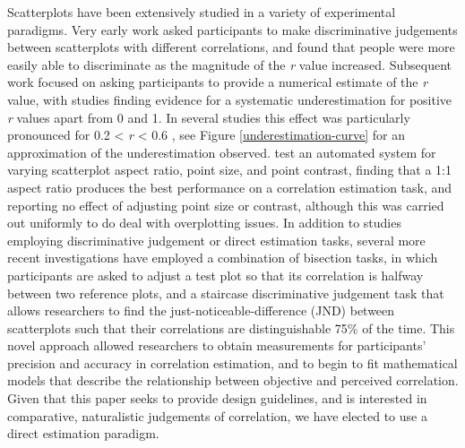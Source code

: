 \documentclass[preprint, 3p,
authoryear]{elsarticle} %
\begin{document}
Scatterplots have been extensively studied in a variety of experimental
paradigms. Very early work \citep{pollack_1960} asked participants to
make discriminative judgements between scatterplots with different
correlations, and found that people were more easily able to
discriminate as the magnitude of the \emph{r} value increased.
Subsequent work focused on asking participants to provide a numerical
estimate of the \emph{r} value, with studies finding evidence for a
systematic underestimation for positive \emph{r} values apart from 0 and
1. In several studies this effect was particularly pronounced for 0.2
\textless{} \emph{r} \textless{} 0.6
\citep{strahan_1978, bobko_1979, cleveland_1982, lane_1985, lauer_1989, collyer_1990, meyer_1992},
see Figure \ref{underestimation-curve} for an approximation of the
underestimation observed. \citealp{micallef_2017} test an automated
system for varying scatterplot aspect ratio, point size, and point
contrast, finding that a 1:1 aspect ratio produces the best performance
on a correlation estimation task, and reporting no effect of adjusting
point size or contrast, although this was carried out uniformly to do
deal with overplotting issues. In addition to studies employing
discriminative judgement or direct estimation tasks, several more recent
investigations have employed a combination of bisection tasks, in which
participants are asked to adjust a test plot so that its correlation is
halfway between two reference plots, and a staircase discriminative
judgement task that allows researchers to find the
just-noticeable-difference (JND) between scatterplots such that their
correlations are distinguishable 75\% of the time. This novel approach
\citep{rensink_2010} allowed researchers to obtain measurements for
participants' precision and accuracy in correlation estimation, and to
begin to fit mathematical models that describe the relationship between
objective and perceived correlation. Given that this paper seeks to
provide design guidelines, and is interested in comparative,
naturalistic judgements of correlation, we have elected to use a direct
estimation paradigm.
\end{document}
